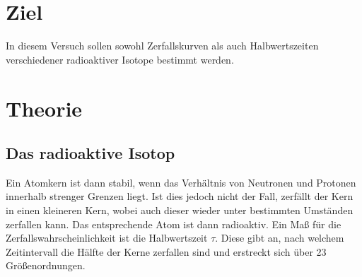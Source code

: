 \section{Ziel}
In diesem Versuch sollen sowohl Zerfallskurven als auch Halbwertszeiten verschiedener radioaktiver Isotope
bestimmt werden.

\section{Theorie}
\subsection{Das radioaktive Isotop}
Ein Atomkern ist dann stabil, wenn das Verhältnis von Neutronen und Protonen innerhalb strenger Grenzen liegt.
Ist dies jedoch nicht der Fall, zerfällt der Kern in einen kleineren Kern, wobei auch dieser wieder unter bestimmten Umständen zerfallen kann.
Das entsprechende Atom ist dann radioaktiv.
Ein Maß für die Zerfallswahrscheinlichkeit ist die Halbwertszeit $\tau$. Diese gibt an, nach welchem Zeitintervall die Hälfte der Kerne zerfallen sind und erstreckt sich über
23 Größenordnungen.

